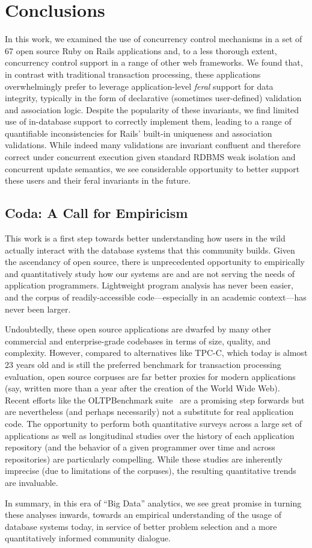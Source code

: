 
\section{Conclusions}
\label{sec:conclusion}

In this work, we examined the use of concurrency control mechanisms in
a set of 67 open source Ruby on Rails applications and, to a less
thorough extent, concurrency control support in a range of other web
frameworks. We found that, in contrast with traditional transaction
processing, these applications overwhelmingly prefer to leverage
application-level \textit{feral} support for data integrity, typically
in the form of declarative (sometimes user-defined) validation and
association logic. Despite the popularity of these invariants, we find
limited use of in-database support to correctly implement them,
leading to a range of quantifiable inconsistencies for Rails' built-in
uniqueness and association validations. While indeed many validations
are invariant confluent and therefore correct under concurrent
execution given standard RDBMS weak isolation and concurrent update
semantics, we see considerable opportunity to better support these
users and their feral invariants in the future.


\subsection*{Coda: A Call for Empiricism}

This work is a first step towards better understanding how users in
the wild actually interact with the database systems that this
community builds. Given the ascendancy of open source, there is
unprecedented opportunity to empirically and quantitatively study how
our systems are and are not serving the needs of application
programmers. Lightweight program analysis has never been easier, and
the corpus of readily-accessible code---especially in an academic
context---has never been larger.

Undoubtedly, these open source applications are dwarfed by many other
commercial and enterprise-grade codebases in terms of size, quality,
and complexity. However, compared to alternatives like TPC-C, which
today is almost 23 years old and is still the preferred benchmark for
transaction processing evaluation, open source corpuses are far better
proxies for modern applications (say, written more than a year after
the creation of the World Wide Web). Recent efforts like the
OLTPBenchmark suite~\cite{oltpbench} are a promising step forwards but
are nevertheless (and perhaps necessarily) not a substitute for real
application code. The opportunity to perform both quantitative surveys
across a large set of applications as well as longitudinal studies
over the history of each application repository (and the behavior of a
given programmer over time and across repositories) are particularly
compelling. While these studies are inherently imprecise (due to
limitations of the corpuses), the resulting quantitative trends are
invaluable.

In summary, in this era of ``Big Data'' analytics, we see great
promise in turning these analyses inwards, towards an empirical
understanding of the usage of database systems today, in service of
better problem selection and a more quantitatively informed community
dialogue.

